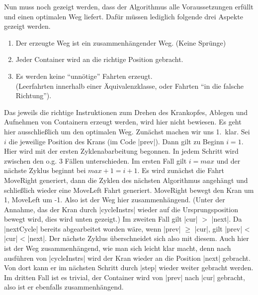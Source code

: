 Nun muss noch gezeigt werden, dass der Algorithmus alle Voraussetzungen erfüllt und einen optimalen Weg liefert.
Dafür müssen lediglich folgende drei Aspekte gezeigt werden.
\begin{enumerate}
 \item Der erzeugte Weg ist ein zusammenhängender Weg. (Keine Sprünge)
 \item Jeder Container wird an die richtige Position gebracht.
 \item Es werden keine ``unnötige'' Fahrten erzeugt. \\
       (Leerfahrten innerhalb einer Äquivalenzklasse, oder Fahrten ``in die falsche Richtung'').
\end{enumerate}
Das jeweils die richtige Instruktionen zum Drehen des Krankopfes, Ablegen und Aufnehmen von Containern erzeugt werden, wird hier nicht bewiesen.
Es geht hier ausschließlich um den optimalen Weg. Zunächst machen wir uns 1.\ klar. Sei $i$ die jeweilige Position des Krans (im Code |prev|).
Dann gilt zu Beginn $i = 1$. Hier wird mit der ersten Zyklenabarbeitung begonnen. In jedem Schritt wird zwischen den o.g. 3 Fällen unterschieden.
Im ersten Fall gilt $i=max$ und der nächste Zyklus beginnt bei $max+1=i+1$.
Es wird zunächst die Fahrt MoveRight generiert, dann die Zyklen des nächsten Algorithmus angehängt und schließlich wieder eine MoveLeft Fahrt generiert.
MoveRight bewegt den Kran um 1, MoveLeft um -1. Also ist der Weg hier zusammenhängend.
(Unter der Annahme, das der Kran durch |cycleInstrs| wieder auf die Ursprungsposition bewegt wird, dies wird unten gezeigt.)
Im zweiten Fall gilt |cur| $>$ |next|. Da |nextCycle| bereits abgearbeitet worden wäre, wenn |prev| $\geq$ |cur|, gilt |prev| < |cur| < |next|.
Der nächste Zyklus überschneidet sich also mit diesem.
Auch hier ist der Weg zusammenhängend, wie man sich leicht klar macht, denn nach ausführen von |cycleInstrs| wird der Kran wieder an die Position |next| gebracht.
Von dort kann er im nächsten Schritt durch |step| wieder weiter gebracht werden.
Im dritten Fall ist es trivial, der Container wird von |prev| nach |cur| gebracht, also ist er ebenfalls zusammenhängend.

